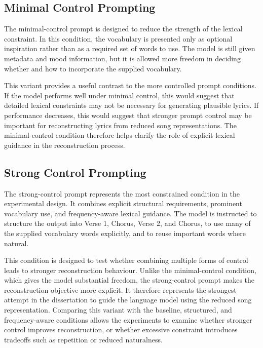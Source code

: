 \subsection{Minimal Control Prompting}

The minimal-control prompt is designed to reduce the strength of the lexical constraint. In this condition, the vocabulary is presented only as optional inspiration rather than as a required set of words to use. The model is still given metadata and mood information, but it is allowed more freedom in deciding whether and how to incorporate the supplied vocabulary.

This variant provides a useful contrast to the more controlled prompt conditions. If the model performs well under minimal control, this would suggest that detailed lexical constraints may not be necessary for generating plausible lyrics. If performance decreases, this would suggest that stronger prompt control may be important for reconstructing lyrics from reduced song representations. The minimal-control condition therefore helps clarify the role of explicit lexical guidance in the reconstruction process.

\subsection{Strong Control Prompting}

The strong-control prompt represents the most constrained condition in the experimental design. It combines explicit structural requirements, prominent vocabulary use, and frequency-aware lexical guidance. The model is instructed to structure the output into Verse 1, Chorus, Verse 2, and Chorus, to use many of the supplied vocabulary words explicitly, and to reuse important words where natural.

This condition is designed to test whether combining multiple forms of control leads to stronger reconstruction behaviour. Unlike the minimal-control condition, which gives the model substantial freedom, the strong-control prompt makes the reconstruction objective more explicit. It therefore represents the strongest attempt in the dissertation to guide the language model using the reduced song representation. Comparing this variant with the baseline, structured, and frequency-aware conditions allows the experiments to examine whether stronger control improves reconstruction, or whether excessive constraint introduces tradeoffs such as repetition or reduced naturalness.

